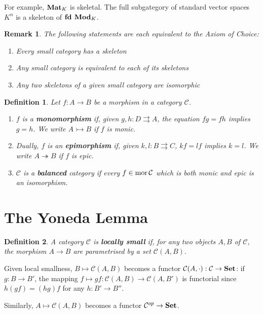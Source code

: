 \documentclass[a4paper]{article}
\newtheorem*{definition}{Definition}
\newtheorem*{remark}{Remark}
\newcommand*\mor[1]{\textnormal{mor}\,#1}
\begin{document}
For example, $\text{\textbf{Mat}}_K$ is skeletal. The full subgategory of standard vector spaces $K^n$ is a skeleton of $\text{\textbf{fd Mod}}_K$.

\begin{remark}
	The following statements are each equivalent to the Axiom of Choice:
	\begin{enumerate}
		\item Every small category has a skeleton
		\item Any small category is equivalent to each of its skeletons
		\item Any two skeletons of a given small category are isomorphic
	\end{enumerate}
\end{remark}

\begin{definition}
	Let $f: A \to B$ be a morphism in a category $\mathcal{C}$.
	\begin{enumerate}[label=\alph*.]
		\item $f$ is a \textbf{monomorphism} if, given $g,h:D \rightrightarrows A$, the equation $fg = fh$ implies $g=h$. We write $A \rightarrowtail B$ if $f$ is monic.
		\item Dually, $f$ is an \textbf{epimorphism} if, given $k,l: B \rightrightarrows C$, $kf = lf$ implies $k=l$. We write $A \twoheadrightarrow B$ if $f$ is epic.
		\item $\mathcal{C}$ is a \textbf{balanced} category if every $f \in \mor \mathcal{C}$ which is both monic and epic is an isomorphism.
	\end{enumerate}
\end{definition}

\section{The Yoneda Lemma}
\begin{definition}
	A category $\mathcal{C}$ is \textbf{locally small} if, for any two objects $A, B$ of $\mathcal{C}$, the morphism $A \to B$ are parametrised by a set $\mathcal{C}(A, B)$.
\end{definition}

Given local smallness, $B \mapsto \mathcal{C}(A,B)$ becomes a functor $\mathcal{C}(A, \cdot): \mathcal{C} \to \text{\textbf{Set}}$: if $g: B \to B'$, the mapping $f \mapsto gf : \mathcal{C}(A, B) \to \mathcal{C}(A, B')$ is functorial since $h(gf) = (hg)f$ for any $h: B' \to B''$.

Similarly, $A \mapsto \mathcal{C}(A, B)$ becomes a functor $\mathcal{C}^{op} \to \text{\textbf{Set}}$.
	
\end{document}
